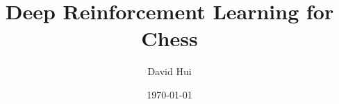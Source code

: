 \documentclass[a4paper]{book}
\title{Deep Reinforcement Learning for Chess}
\date{\today}
\author{David Hui}
\begin{document}
\maketitle
\tableofcontents


\chapter{}
\end{document}
